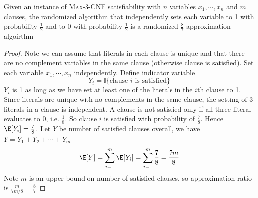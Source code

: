 \documentclass[11pt]{article}
\begin{document}
\begin{theorem*}
    Given an instance of \textsc{Max-3-CNF} satisfiability with $n$ variables $x_1, \cdots, x_n$ and $m$ clauses, the randomized algorithm that independently sets each variable to 1 with probability $\frac{1}{2}$ and to 0 with probability $\frac{1}{2}$ is a randomized $\frac{8}{7}$-approximation algoirthm
    \begin{proof}
        Note we can assume that literals in each clause is unique and that there are no complement variables in the same clause (otherwise clause is satisfied). Set each variable $x_1, \cdots, x_n$ independently. Define indicator variable 
        \[
            Y_i = \mathbb{I}\{ \text{clause $i$ is satisfied} \}
        \]
        $Y_i$ is 1 as long as we have set at least one of the literals in the $i$th clause to 1. Since literals are unique with no complements in the same clause, the setting of 3 literals in a clause is independent. A clause is not satisfied only if all three literal evaluates to 0, i.e. $\frac{1}{8}$. So clause $i$ is satisfied with probability of $\frac{7}{8}$. Hence $\E[Y_i] = \frac{7}{8}$. Let $Y$ be number of satisfied clauses overall, we have $Y = Y_1 + Y_2 + \cdots + Y_m$
        \[
            \E[Y] = \sum_{i=1}^m \E[Y_i] = \sum_{i=1}^m \frac{7}{8} = \frac{7m}{8}
        \]
        Note $m$ is an upper bound on number of satisfied clauses, so approximation ratio is $\frac{m}{7m / 8} = \frac{8}{7}$
    \end{proof}
\end{theorem*}
\end{document}
